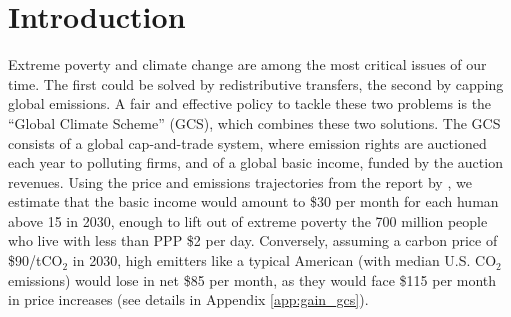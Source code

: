 \tableofcontents

\onehalfspacing %

\section{Introduction}  %


Extreme poverty and climate change are among the most critical issues of our time. The first could be solved by redistributive transfers, the second by capping global emissions. %
A fair and effective policy to tackle these two problems is the ``Global Climate Scheme'' (GCS), which combines these two solutions. The GCS consists of a global cap-and-trade system, where emission rights are auctioned each year to polluting firms, and of a global basic income, funded by the auction revenues. 
Using the price and emissions trajectories from the report by \cite{stern_report_2017}, %
we estimate that the basic income would amount to \$30 per month for each human above 15 in 2030, enough to lift out of extreme poverty the 700 million people who live with less than PPP \$2 per day. Conversely, assuming a carbon price of \$90/tCO$_\text{2}$ in 2030, high emitters like a typical American (with median U.S. CO$_\text{2}$ emissions) would lose in net \$85 per month, as they would face \$115 per month in price increases (see details in Appendix \ref{app:gain_gcs}). 

